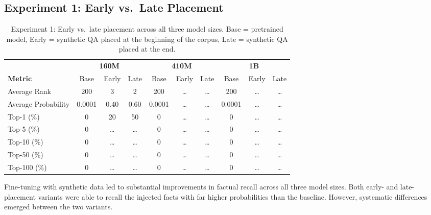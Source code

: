 \documentclass[11pt]{article}
\begin{document}
    \subsection{Experiment 1: Early vs.\ Late Placement}
    \begin{table*}[htbp]
        \centering
        \small
        \begin{tabular}{l|ccc|ccc|ccc}
            \hline
            & \multicolumn{3}{c|}{\textbf{160M}} & \multicolumn{3}{c|}{\textbf{410M}} & \multicolumn{3}{c}{\textbf{1B}} \\
            \textbf{Metric} & Base & Early & Late & Base & Early & Late & Base & Early & Late \\
            \hline
            Average Rank        & 200    & 3      & 2      & 200    & \dots & \dots & 200    & \dots & \dots \\
            Average Probability & 0.0001 & 0.40   & 0.60   & 0.0001 & \dots & \dots & 0.0001 & \dots & \dots \\
            Top-1 (\%)          & 0      & 20     & 50     & 0      & \dots & \dots & 0      & \dots & \dots \\
            Top-5 (\%)          & 0      & \dots  & \dots  & 0      & \dots & \dots & 0      & \dots & \dots \\
            Top-10 (\%)         & 0      & \dots  & \dots  & 0      & \dots & \dots & 0      & \dots & \dots \\
            Top-50 (\%)         & 0      & \dots  & \dots  & 0      & \dots & \dots & 0      & \dots & \dots \\
            Top-100 (\%)        & 0      & \dots  & \dots  & 0      & \dots & \dots & 0      & \dots & \dots \\
            \hline
        \end{tabular}
        \caption{Experiment 1: Early vs.\ late placement across all three model sizes.
        Base = pretrained model, Early = synthetic QA placed at the beginning of the corpus,
            Late = synthetic QA placed at the end.}
        \label{tab:early-late-all}
    \end{table*}


    Fine-tuning with synthetic data led to substantial improvements in factual recall across all three model sizes. Both early- and late-placement variants were able to recall the injected facts with far higher probabilities than the baseline. However, systematic differences emerged between the two variants.
\end{document}
